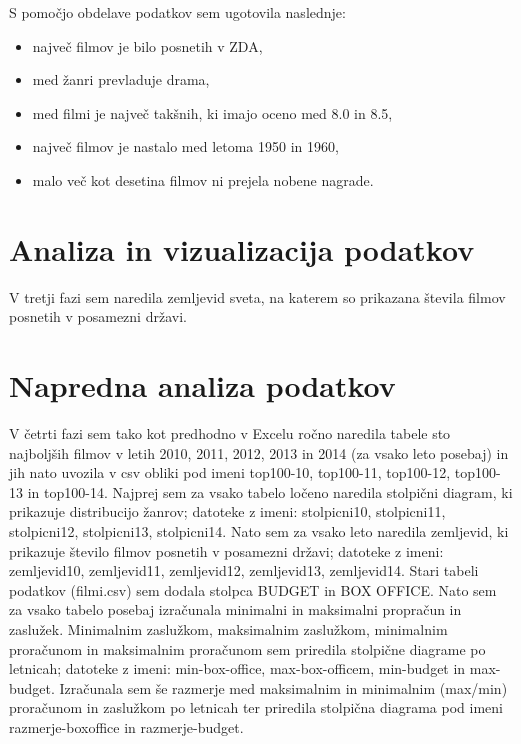 \documentclass[11pt,a4paper]{article}
\begin{document}
\null
\null
S pomočjo obdelave podatkov sem ugotovila naslednje:
\begin{itemize}
\item največ filmov je bilo posnetih v ZDA,
\item med žanri prevladuje drama,
\item med filmi je največ takšnih, ki imajo oceno med 8.0 in 8.5,
\item največ filmov je nastalo med letoma 1950 in 1960,
\item malo več kot desetina filmov ni prejela nobene nagrade.
\end{itemize}

 







\section{Analiza in vizualizacija podatkov}

V tretji fazi sem naredila zemljevid sveta, na katerem so prikazana števila filmov posnetih v posamezni državi.

\begin{figure}[H]

\end{figure}

\pagebreak
\section{Napredna analiza podatkov}
 
V četrti fazi sem tako kot predhodno v Excelu ročno naredila tabele sto najboljših filmov v letih 2010, 2011, 2012, 2013 in 2014 (za vsako leto posebaj) in jih nato uvozila v csv obliki pod imeni top100-10, top100-11, top100-12, top100-13 in top100-14. Najprej sem za vsako tabelo ločeno naredila stolpični diagram, ki prikazuje distribucijo žanrov; datoteke z imeni: stolpicni10, stolpicni11, stolpicni12, stolpicni13, stolpicni14. Nato sem za vsako leto naredila zemljevid, ki prikazuje število filmov posnetih v posamezni državi; datoteke z imeni: zemljevid10, zemljevid11, zemljevid12, zemljevid13, zemljevid14.
Stari tabeli podatkov (filmi.csv) sem dodala stolpca BUDGET in BOX OFFICE. Nato sem za vsako tabelo posebaj izračunala minimalni in maksimalni propračun in zaslužek. Minimalnim zaslužkom, maksimalnim zaslužkom, minimalnim proračunom in maksimalnim proračunom sem priredila stolpične diagrame po letnicah; datoteke z imeni: min-box-office, max-box-officem, min-budget in max-budget. Izračunala sem še razmerje med maksimalnim in minimalnim (max/min) proračunom in zaslužkom po letnicah ter priredila stolpična diagrama pod imeni razmerje-boxoffice in razmerje-budget.
\end{document}
